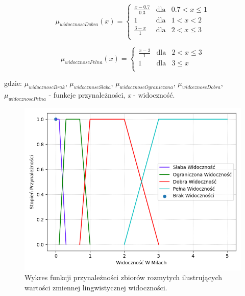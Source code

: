 \documentclass{classrep}
\begin{document}
\begin{equation}
\mu _{widocznoscDobra}(x) = \left\{ \begin{array}{rcl}
\frac{x - 0.7}{0.3} & \mbox{dla} & 0.7 < x \leq 1\\
1 & \mbox{dla} & 1 < x < 2\\
\frac{3 - x}{1} & \mbox{dla} & 2 < x \leq 3\\
\end{array}\right.
\end{equation}

\begin{equation}
\mu _{widocznoscPelna}(x) = \left\{ \begin{array}{rcl}
\frac{x - 3}{1} & \mbox{dla} & 2 < x \leq 3\\
1 & \mbox{dla} & 3 \leq x\\
\end{array}\right.
\end{equation}

gdzie: \(\mu _{widocznoscBrak}\), \(\mu _{widocznoscSlaba}\), \(\mu _{widocznoscOgraniczona}\), \(\mu _{widocznoscDobra}\), \(\mu _{widocznoscPelna}\) - funkcje przynależności, \textit{x} - widoczność.

\begin{figure}[h!]
\centering
\includegraphics[width=14cm]{FunkcjaPrzynaleznosciWidocznosc.png}
\vspace{-0.3cm}
\caption{Wykres funkcji przynależności zbiorów rozmytych ilustrujących wartości zmiennej lingwistycznej widoczności. }
\label{rysunek do eksperymentu 1 wariantu 1}
\end{figure}
\newpage
\end{document}
